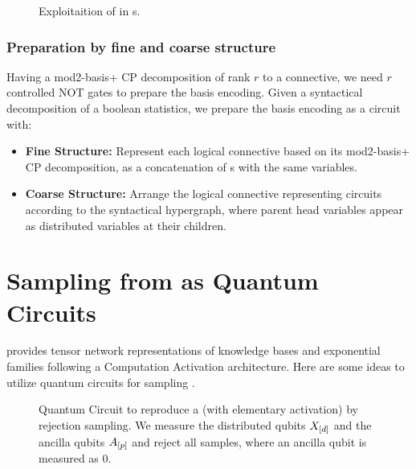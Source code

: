\documentclass[aps,onecolumn,nofootinbib,pra]{article}
\begin{document}
    \begin{figure}
        \begin{center}
            
        \end{center}
        \caption{
           Exploitaition of \PolynomialSparsity{} in \computationCircuit{}s.
        }\label{fig:qcbencodingPolynomial}
    \end{figure}


    \subsubsection{Preparation by fine and coarse structure}

    Having a mod2-basis+ CP decomposition of rank $r$ to a connective, we need $r$ controlled NOT gates to prepare the basis encoding.
    Given a syntactical decomposition of a boolean statistics, we prepare the basis encoding as a circuit with:
    \begin{itemize}
        \item \textbf{Fine Structure:} Represent each logical connective based on its mod2-basis+ CP decomposition, as a concatenation of \computationCircuit{}s with the same variables.
        \item \textbf{Coarse Structure:} Arrange the logical connective representing circuits according to the syntactical hypergraph, where parent head variables appear as distributed variables at their children.
    \end{itemize}


    \section{Sampling from \ComputationActivationNetworks{} as Quantum Circuits}

    \tnreason{} provides tensor network representations of knowledge bases and exponential families following a Computation Activation architecture.
    Here are some ideas to utilize quantum circuits for sampling \ComputationActivationNetworks{}.

    \begin{figure}
        \begin{center}
            
        \end{center}
        \caption{
            Quantum Circuit to reproduce a \ComputationActivationNetwork{} (with elementary activation) by rejection sampling.
            We measure the distributed qubits $X_{[d]}$ and the ancilla qubits $A_{[p]}$ and reject all samples, where an ancilla qubit is measured as $0$.
        }
    \end{figure}
\end{document}
